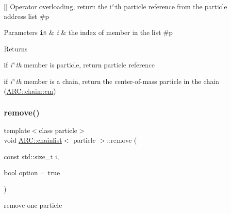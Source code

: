 \mbox{[}\mbox{]} Operator overloading, return the i$^\wedge$th particle reference from the particle address list \#p 
\begin{DoxyParams}[1]{Parameters}
\mbox{\tt in}  & {\em i} & the index of member in the list \#p \\
\hline
\end{DoxyParams}
\begin{DoxyReturn}{Returns}

\begin{DoxyItemize}
\item if {\itshape i$^\wedge$th} member is particle, return particle reference
\item if {\itshape i$^\wedge$th} member is a chain, return the center-\/of-\/mass particle in the chain (\hyperlink{classARC_1_1chain_ae9f6a5cbf7aac2b33c7274e7e10916ed}{A\+R\+C\+::chain\+::cm}) 
\end{DoxyItemize}
\end{DoxyReturn}
\hypertarget{classARC_1_1chainlist_acfd8eb70053894bd0883a77d6c111932}{}\label{classARC_1_1chainlist_acfd8eb70053894bd0883a77d6c111932} 
\subsubsection{\texorpdfstring{remove()}{remove()}}
{\footnotesize\ttfamily template$<$class particle$>$ \\
void \hyperlink{classARC_1_1chainlist}{A\+R\+C\+::chainlist}$<$ particle $>$\+::remove (\begin{DoxyParamCaption}\item[{const std\+::size\+\_\+t}]{i,  }\item[{bool}]{option = {\ttfamily true} }\end{DoxyParamCaption})\hspace{0.3cm}{\ttfamily [inline]}}



remove one particle 

